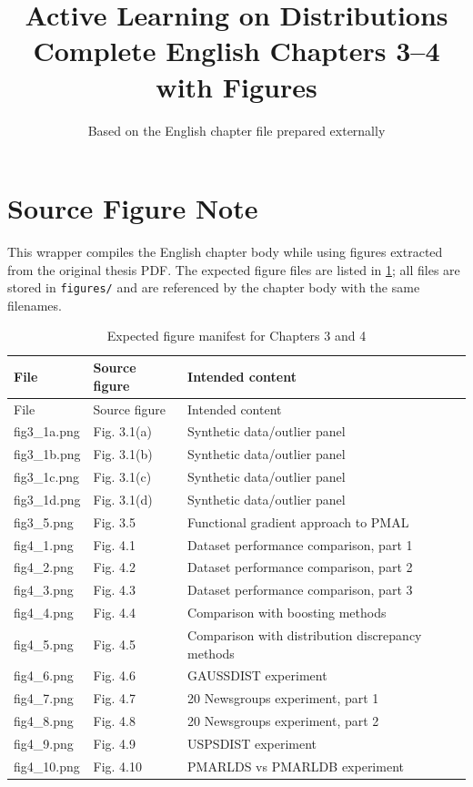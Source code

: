 \documentclass[12pt,a4paper]{report}
\title{Active Learning on Distributions\\\large Complete English Chapters 3--4 with Figures}
\author{Based on the English chapter file prepared externally}
\date{}
\begin{document}
\maketitle
\tableofcontents

\chapter*{Source Figure Note}
This wrapper compiles the English chapter body while using figures extracted from the original thesis PDF. The expected figure files are listed in \cref{tab:figure-manifest}; all files are stored in \texttt{figures/} and are referenced by the chapter body with the same filenames.

\begin{longtable}{lll}
\caption{Expected figure manifest for Chapters 3 and 4}\label{tab:figure-manifest}\\
\toprule
File & Source figure & Intended content \\
\midrule
\endfirsthead
\toprule
File & Source figure & Intended content \\
\midrule
\endhead
fig3\_1a.png & Fig. 3.1(a) & Synthetic data/outlier panel \\
fig3\_1b.png & Fig. 3.1(b) & Synthetic data/outlier panel \\
fig3\_1c.png & Fig. 3.1(c) & Synthetic data/outlier panel \\
fig3\_1d.png & Fig. 3.1(d) & Synthetic data/outlier panel \\
fig3\_5.png & Fig. 3.5 & Functional gradient approach to PMAL \\
fig4\_1.png & Fig. 4.1 & Dataset performance comparison, part 1 \\
fig4\_2.png & Fig. 4.2 & Dataset performance comparison, part 2 \\
fig4\_3.png & Fig. 4.3 & Dataset performance comparison, part 3 \\
fig4\_4.png & Fig. 4.4 & Comparison with boosting methods \\
fig4\_5.png & Fig. 4.5 & Comparison with distribution discrepancy methods \\
fig4\_6.png & Fig. 4.6 & GAUSSDIST experiment \\
fig4\_7.png & Fig. 4.7 & 20 Newsgroups experiment, part 1 \\
fig4\_8.png & Fig. 4.8 & 20 Newsgroups experiment, part 2 \\
fig4\_9.png & Fig. 4.9 & USPSDIST experiment \\
fig4\_10.png & Fig. 4.10 & PMARLDS vs PMARLDB experiment \\
\bottomrule
\end{longtable}
\end{document}
